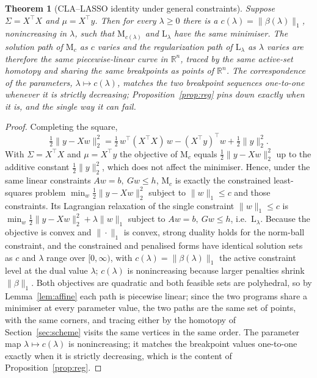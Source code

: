 \documentclass[sts]{imsart}
\newcommand{\R}{\mathbb{R}}
\newcommand{\Sig}{\Sigma}
\newcommand{\trans}{^{\top}}
\theoremstyle{plain}
\newtheorem{theorem}{Theorem}
\theoremstyle{definition}
\begin{document}
\begin{theorem}[CLA--LASSO identity under general constraints]
\label{thm:identity}
Suppose $\Sig = X\trans X$ and $\mu = X\trans y$. Then for every $\lambda\ge 0$ there is
a $c(\lambda)=\|\beta(\lambda)\|_1$, nonincreasing in $\lambda$, such that
$\mathrm{M}_{c(\lambda)}$ and $\mathrm{L}_\lambda$ have the same minimiser. The solution
path of $\mathrm{M}_c$ as $c$ varies and the regularization path of
$\mathrm{L}_\lambda$ as $\lambda$ varies are therefore the \emph{same} piecewise-linear
curve in $\R^n$, traced by the same active-set homotopy and sharing the same breakpoints
as points of $\R^n$. The correspondence of the \emph{parameters},
$\lambda\mapsto c(\lambda)$, matches the two breakpoint sequences one-to-one whenever it
is strictly decreasing; Proposition~\ref{prop:reg} pins down exactly when it is, and the
single way it can fail.
\end{theorem}

\begin{proof}
Completing the square,
\[
\tfrac12\|y-Xw\|_2^2 = \tfrac12\, w\trans (X\trans X)\, w - (X\trans y)\trans w
+ \tfrac12\|y\|_2^2 .
\]
With $\Sig=X\trans X$ and $\mu=X\trans y$ the
objective of $\mathrm{M}_c$ equals $\tfrac12\|y-Xw\|_2^2$ up to the additive constant
$\tfrac12\|y\|_2^2$, which does not affect the minimiser. Hence, under the same linear
constraints $Aw=b,\ Gw\le h$, $\mathrm{M}_c$ is exactly the constrained least-squares
problem $\min_w \tfrac12\|y-Xw\|_2^2$ subject to $\|w\|_1\le c$ and those constraints.
Its Lagrangian relaxation of the single constraint $\|w\|_1\le c$ is
$\min_w \tfrac12\|y-Xw\|_2^2 + \lambda\|w\|_1$ subject to $Aw=b,\ Gw\le h$, i.e.\
$\mathrm{L}_\lambda$. Because the objective is convex and $\|\cdot\|_1$ is convex,
strong duality holds for the norm-ball constraint, and the constrained and penalised
forms have identical solution sets as $c$ and $\lambda$ range over $[0,\infty)$, with
$c(\lambda)=\|\beta(\lambda)\|_1$ the active constraint level at the dual value
$\lambda$; $c(\lambda)$ is nonincreasing because larger penalties shrink $\|\beta\|_1$.
Both objectives are quadratic and both feasible sets are polyhedral, so by
Lemma~\ref{lem:affine} each path is piecewise linear; since the two programs share a
minimiser at every parameter value, the two paths are the same set of points, with the
same corners, and tracing either by the homotopy of Section~\ref{sec:scheme} visits the
same vertices in the same order. The parameter map $\lambda\mapsto c(\lambda)$ is
nonincreasing; it matches the breakpoint values one-to-one exactly when it is strictly
decreasing, which is the content of Proposition~\ref{prop:reg}.
\end{proof}
\end{document}
